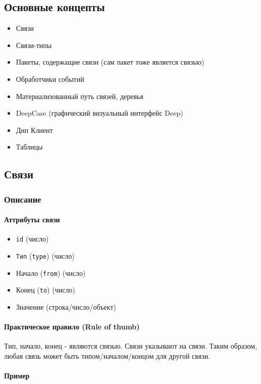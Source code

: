 \documentclass{article}
\begin{document}
\subsection{Основные концепты}

\begin{itemize}
  \item Связи
  \item Связи-типы
  \item Пакеты, содержащие связи (сам пакет тоже является связью)
  \item Обработчики событий
  \item Материализованный путь связей, деревья
  \item DeepCase (графический визуальный интерфейс Deep)
  \item Дип Клиент
  \item Таблицы
\end{itemize}

\subsection{Связи}

\subsubsection{Описание}

\paragraph{Аттрибуты связи}

\begin{itemize}
  \item \texttt{id} (число)
  \item \texttt{Тип} (\texttt{type}) (число)
  \item Начало (\texttt{from}) (число)
  \item Конец (\texttt{to}) (число)
  \item Значение (строка/число/объект)
\end{itemize}

\paragraph{Практическое правило (Rule of thumb)}
Тип, начало, конец - являются связью. Связи указывают на связи. Таким образом,
любая связь может быть типом/началом/концом для другой связи.

\paragraph{Пример}
\end{document}
